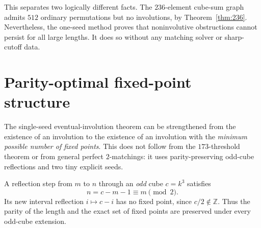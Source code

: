 \documentclass[10pt]{article}
\begin{document}
This separates two logically different
facts. The $236$-element cube-sum graph
admits $512$ ordinary permutations but
no involutions, by
Theorem~\ref{thm:236}. Nevertheless,
the one-seed method proves that
noninvolutive obstructions cannot
persist for all large lengths.
It does so without any matching
solver or sharp-cutoff data.

\section{Parity-optimal fixed-point structure}
\label{sec:minimal-fixed-points}

The single-seed eventual-involution theorem
can be strengthened from the existence of
an involution to the existence of an
involution with the \emph{minimum possible
number of fixed points}. This does not
follow from the $173$-threshold theorem
or from general perfect $2$-matchings:
it uses parity-preserving odd-cube
reflections and two tiny explicit seeds.

A reflection step from $m$ to $n$
through an \emph{odd} cube $c=k^3$
satisfies
\[
n=c-m-1\equiv m\pmod2.
\]
Its new interval reflection
$i\mapsto c-i$ has no fixed point,
since $c/2\notin\mathbb Z$.
Thus the parity of the length and
the exact set of fixed points
are preserved under every odd-cube
extension.
\end{document}
